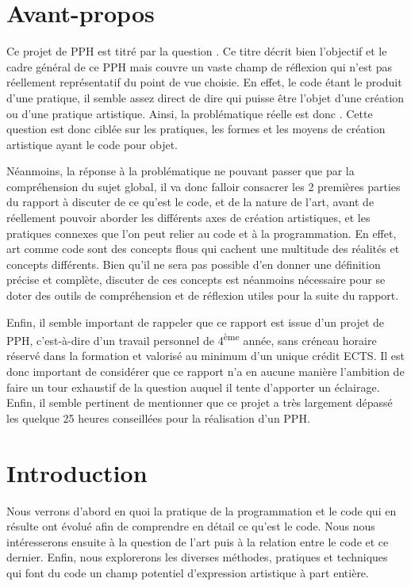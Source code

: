 \documentclass[12pt]{article} %
\newcommand{\ts}{\textsuperscript} %
\begin{document}
\section*{Avant-propos}
Ce projet de PPH est titré par la question . Ce titre décrit bien l'objectif et le cadre général de ce PPH mais couvre un vaste champ de réflexion qui n'est pas réellement représentatif du point de vue choisie. En effet, le code étant le produit d'une pratique, il semble assez direct de dire qui puisse être l'objet d'une création ou d'une pratique artistique. Ainsi, la problématique réelle est donc . Cette question est donc ciblée sur les pratiques, les formes et les moyens de création artistique ayant le code pour objet.

Néanmoins, la réponse à la problématique ne pouvant passer que par la compréhension du sujet global, il va donc falloir consacrer les 2 premières parties du rapport à discuter de ce qu'est le code, et de la nature de l'art, avant de réellement pouvoir aborder les différents axes de création artistiques, et les pratiques connexes que l'on peut relier au code et à la programmation. En effet, art comme code sont des concepts flous qui cachent une multitude des réalités et concepts différents. Bien qu'il ne sera pas possible d'en donner une définition précise et complète, discuter de ces concepts est néanmoins nécessaire pour se doter des outils de compréhension et de réflexion utiles pour la suite du rapport.

Enfin, il semble important de rappeler que ce rapport est issue d'un projet de PPH, c'est-à-dire d'un travail personnel de 4\ts{ème} année, sans créneau horaire réservé dans la formation et valorisé au minimum d'un unique crédit ECTS. Il est donc important de considérer que ce rapport n'a en aucune manière l'ambition de faire un tour exhaustif de la question auquel il tente d'apporter un éclairage. Enfin, il semble pertinent de mentionner que ce projet a très largement dépassé les quelque 25 heures conseillées pour la réalisation d'un PPH.

\newpage
\tableofcontents

\newpage
{} %

\section{Introduction}
Nous verrons d'abord en quoi la pratique de la programmation et le code qui en résulte ont évolué afin de comprendre en détail ce qu'est le code. Nous nous intéresserons ensuite à la question de l'art puis à la relation entre le code et ce dernier. Enfin, nous explorerons les diverses méthodes, pratiques et techniques qui font du code un champ potentiel d'expression artistique à part entière.
\end{document}
